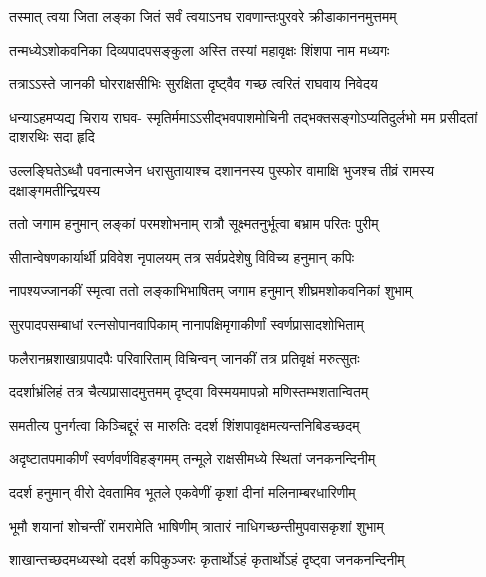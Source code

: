 \twolineshloka
{तस्मात् त्वया जिता लङ्का जितं सर्वं त्वयाऽनघ}
{रावणान्तःपुरवरे क्रीडाकाननमुत्तमम्} %

\twolineshloka
{तन्मध्येऽशोकवनिका दिव्यपादपसङ्कुला}
{अस्ति तस्यां महावृक्षः शिंशपा नाम मध्यगः} %

\twolineshloka
{तत्राऽऽस्ते जानकी घोरराक्षसीभिः सुरक्षिता}
{दृष्ट्वैव गच्छ त्वरितं राघवाय निवेदय} %

\fourlineindentedshloka
{धन्याऽहमप्यद्य चिराय राघव-}
{स्मृतिर्ममाऽऽसीद्भवपाशमोचिनी}
{तद्भक्तसङ्गोऽप्यतिदुर्लभो मम}
{प्रसीदतां दाशरथिः सदा हृदि} %

\fourlineindentedshloka
{उल्लङ्घितेऽब्धौ पवनात्मजेन}
{धरासुतायाश्च दशाननस्य}
{पुस्फोर वामाक्षि भुजश्च तीव्रं}
{रामस्य दक्षाङ्गमतीन्द्रियस्य} %






\twolineshloka
{ततो जगाम हनुमान् लङ्कां परमशोभनाम्}
{रात्रौ सूक्ष्मतनुर्भूत्वा बभ्राम परितः पुरीम्} %

\twolineshloka
{सीतान्वेषणकार्यार्थी प्रविवेश नृपालयम्}
{तत्र सर्वप्रदेशेषु विविच्य हनुमान् कपिः} %

\twolineshloka
{नापश्यज्जानकीं स्मृत्वा ततो लङ्काभिभाषितम्}
{जगाम हनुमान् शीघ्रमशोकवनिकां शुभाम्} %

\twolineshloka
{सुरपादपसम्बाधां रत्नसोपानवापिकाम्}
{नानापक्षिमृगाकीर्णां स्वर्णप्रासादशोभिताम्} %

\twolineshloka
{फलैरानम्रशाखाग्रपादपैः परिवारिताम्}
{विचिन्वन् जानकीं तत्र प्रतिवृक्षं मरुत्सुतः} %

\twolineshloka
{ददर्शाभ्रंलिहं तत्र चैत्यप्रासादमुत्तमम्}
{दृष्ट्वा विस्मयमापन्नो मणिस्तम्भशतान्वितम्} %

\twolineshloka
{समतीत्य पुनर्गत्वा किञ्चिद्दूरं स मारुतिः}
{ददर्श शिंशपावृक्षमत्यन्तनिबिडच्छदम्} %

\twolineshloka
{अदृष्टातपमाकीर्णं स्वर्णवर्णविहङ्गमम्}
{तन्मूले राक्षसीमध्ये स्थितां जनकनन्दिनीम्} %

\twolineshloka
{ददर्श हनुमान् वीरो देवतामिव भूतले}
{एकवेणीं कृशां दीनां मलिनाम्बरधारिणीम्} %

\twolineshloka
{भूमौ शयानां शोचन्तीं रामरामेति भाषिणीम्}
{त्रातारं नाधिगच्छन्तीमुपवासकृशां शुभाम्} %

\twolineshloka
{शाखान्तच्छदमध्यस्थो ददर्श कपिकुञ्जरः}
{कृतार्थोऽहं कृतार्थोऽहं दृष्ट्वा जनकनन्दिनीम्} %

